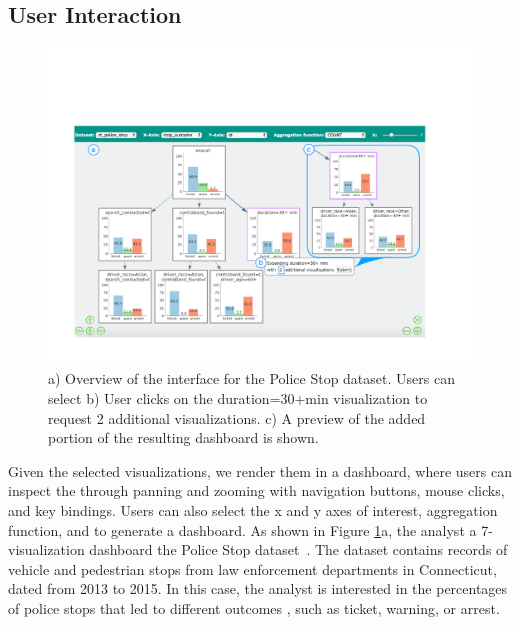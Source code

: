 \subsection{User Interaction\label{sec:interaction}}
\begin{figure}[ht!]
\centering
\includegraphics[width=0.9\linewidth,frame]{figures/overview_interface_expand.pdf}
\caption{a) Overview of the \system interface for the Police Stop dataset. Users can  select  b) User clicks on the duration=30+min visualization to request 2 additional visualizations. c) A preview of the added portion of the resulting dashboard is shown.}
\label{fig:overview}
\vspace{-10pt}
\end{figure}%
\par Given the selected visualizations, we render them in a dashboard, where users can inspect the  through panning and zooming with navigation buttons, mouse clicks, and key bindings. Users can also select the x and y axes of interest, aggregation function, and  to generate a dashboard. As shown in Figure \ref{fig:overview}a, the analyst  a 7-visualization dashboard  the Police Stop dataset~\cite{police}. The dataset contains records of vehicle and pedestrian stops from law enforcement departments in Connecticut, dated from 2013 to 2015. In this case, the analyst is interested in the percentages of police stops  that led to different outcomes , such as ticket, warning, or arrest.
